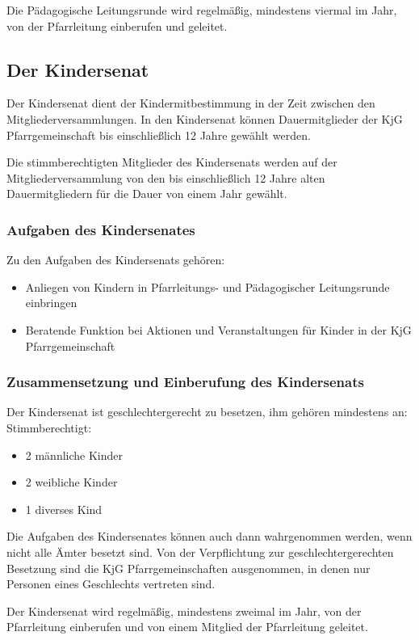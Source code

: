 \documentclass[12pt]{report}
\begin{document}
\begin{flushleft}
Die Pädagogische Leitungsrunde wird regelmäßig, mindestens viermal im Jahr,
von der Pfarrleitung einberufen und geleitet.

\subsection{Der Kindersenat}
Der Kindersenat dient der Kindermitbestimmung in der Zeit zwischen den Mitgliederversammlungen.
In den Kindersenat können Dauermitglieder der KjG Pfarrgemeinschaft bis einschließlich 12
Jahre gewählt werden.

Die stimmberechtigten Mitglieder des Kindersenats werden auf der Mitgliederversammlung von
den bis einschließlich 12 Jahre alten Dauermitgliedern für die Dauer von einem Jahr gewählt.

\subsubsection{Aufgaben des Kindersenates}
Zu den Aufgaben des Kindersenats gehören:
\begin{itemize}
  \item Anliegen von Kindern in Pfarrleitungs- und Pädagogischer Leitungsrunde einbringen
  \item Beratende Funktion bei Aktionen und Veranstaltungen für Kinder in der KjG Pfarrgemeinschaft
\end{itemize}

\subsubsection{Zusammensetzung und Einberufung des Kindersenats}

Der Kindersenat ist {\color{red}geschlechtergerecht} zu besetzen, ihm gehören mindestens an:
Stimmberechtigt:
{\color{red}
\begin{itemize}
  \item 2 männliche Kinder
  \item 2 weibliche Kinder
  \item 1 diverses Kind
\end{itemize}
} %
Die Aufgaben des Kindersenates können auch dann wahrgenommen werden, wenn nicht alle Ämter besetzt sind.
{\color{red}Von der Verpflichtung zur geschlechtergerechten Besetzung sind die KjG Pfarrgemeinschaften ausgenommen,
in denen nur Personen eines Geschlechts vertreten sind.}

Der Kindersenat wird regelmäßig, mindestens zweimal im Jahr, von der Pfarrleitung einberufen
und von einem Mitglied der Pfarrleitung geleitet.


\end{flushleft}
\end{document}
